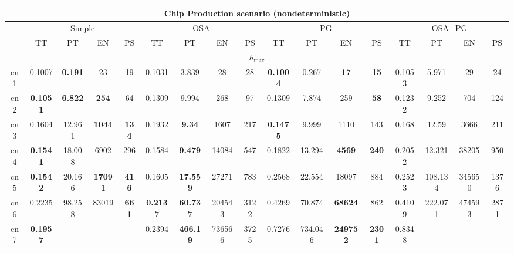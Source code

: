\begin{tabular}{||c||c|c|c|c||c|c|c|c||c|c|c|c||c|c|c|c||}%
\multicolumn{17}{c}{\textbf{Chip Production scenario (nondeterministic)}}\\%
\hline%
&\multicolumn{4}{|c|}{\small{Simple}}&\multicolumn{4}{|c|}{\small{OSA}}&\multicolumn{4}{|c|}{\small{PG}}&\multicolumn{4}{|c|}{\small{OSA+PG}}\\%
\hline%
&\small{TT}&\small{PT}&\small{EN}&\small{PS}&\small{TT}&\small{PT}&\small{EN}&\small{PS}&\small{TT}&\small{PT}&\small{EN}&\small{PS}&\small{TT}&\small{PT}&\small{EN}&\small{PS}\\%
\hline%
\multicolumn{17}{||c||}{$h_{\max}$}\\%
\hline%
cn1&\small{0.1007}&\small{\textbf{0.191}}&\small{23}&\small{19}&\small{0.1031}&\small{3.839}&\small{28}&\small{28}&\small{\textbf{0.1004}}&\small{0.267}&\small{\textbf{17}}&\small{\textbf{15}}&\small{0.1053}&\small{5.971}&\small{29}&\small{24}\\%
\hline%
cn2&\small{\textbf{0.1051}}&\small{\textbf{6.822}}&\small{\textbf{254}}&\small{64}&\small{0.1309}&\small{9.994}&\small{268}&\small{97}&\small{0.1309}&\small{7.874}&\small{259}&\small{\textbf{58}}&\small{0.1232}&\small{9.252}&\small{704}&\small{124}\\%
\hline%
cn3&\small{0.1604}&\small{12.961}&\small{\textbf{1044}}&\small{\textbf{134}}&\small{0.1932}&\small{\textbf{9.34}}&\small{1607}&\small{217}&\small{\textbf{0.1475}}&\small{9.999}&\small{1110}&\small{143}&\small{0.168}&\small{12.59}&\small{3666}&\small{211}\\%
\hline%
cn4&\small{\textbf{0.1541}}&\small{18.008}&\small{6902}&\small{296}&\small{0.1584}&\small{\textbf{9.479}}&\small{14084}&\small{547}&\small{0.1822}&\small{13.294}&\small{\textbf{4569}}&\small{\textbf{240}}&\small{0.2052}&\small{12.321}&\small{38205}&\small{950}\\%
\hline%
cn5&\small{\textbf{0.1542}}&\small{20.166}&\small{\textbf{17091}}&\small{\textbf{416}}&\small{0.1605}&\small{\textbf{17.559}}&\small{27271}&\small{783}&\small{0.2568}&\small{22.554}&\small{18097}&\small{884}&\small{0.2523}&\small{108.134}&\small{345650}&\small{1376}\\%
\hline%
cn6&\small{0.2235}&\small{98.258}&\small{83019}&\small{\textbf{661}}&\small{\textbf{0.2137}}&\small{\textbf{60.737}}&\small{204543}&\small{3122}&\small{0.4269}&\small{70.874}&\small{\textbf{68624}}&\small{862}&\small{0.4109}&\small{222.071}&\small{474593}&\small{2871}\\%
\hline%
cn7&\small{\textbf{0.1957}}&\small{---}&\small{---}&\small{---}&\small{0.2394}&\small{\textbf{466.19}}&\small{736566}&\small{3725}&\small{0.7276}&\small{734.046}&\small{\textbf{249752}}&\small{\textbf{2301}}&\small{0.8348}&\small{---}&\small{---}&\small{---}\\%

\end{tabular}
